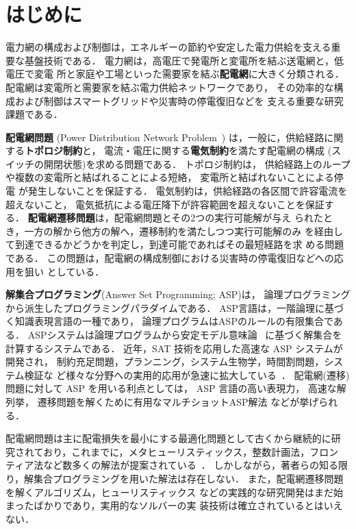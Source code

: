 \section{はじめに}\label{chap:intro}

電力網の構成および制御は，エネルギーの節約や安定した電力供給を支える重
要な基盤技術である．
電力網は，高電圧で発電所と変電所を結ぶ送電網と，低電圧で変電
所と家庭や工場といった需要家を結ぶ\textbf{配電網}に大きく分類される．
配電網は変電所と需要家を結ぶ電力供給ネットワークであり，
その効率的な構成および制御はスマートグリッドや災害時の停電復旧などを
支える重要な研究課題である．

\textbf{配電網問題}
(Power Distribution Network Problem~\cite{Minato:dnet:ZDD,DBLP:journals/tsg/InoueTWKYKTMH14})
は，一般に，供給経路に関する\textbf{トポロジ制約}と，
電流・電圧に関する\textbf{電気制約}を満たす配電網の構成
(スイッチの開閉状態)を求める問題である．
トポロジ制約は，
供給経路上のループや複数の変電所と結ばれることによる短絡，
変電所と結ばれないことによる停電
が発生しないことを保証する．
電気制約は，供給経路の各区間で許容電流を超えないこと，
電気抵抗による電圧降下が許容範囲を超えないことを保証する．
%
\textbf{配電網遷移問題}は，配電網問題とその2つの実行可能解が与え
られたとき，一方の解から他方の解へ，遷移制約を満たしつつ実行可能解のみ
を経由して到達できるかどうかを判定し，到達可能であればその最短経路を求
める問題である．
この問題は，配電網の構成制御における災害時の停電復旧などへの応用を狙い
としている．

\textbf{解集合プログラミング}(Answer Set Programming; ASP\cite{%
  Baral03:cambridge,%
  Gelfond88:iclp,%
  Inoue08:jssst,%
  Niemela99:amai})は，
論理プログラミングから派生したプログラミングパラダイムである．
ASP言語は，一階論理に基づく知識表現言語の一種であり，
論理プログラムはASPのルールの有限集合である．
ASPシステムは論理プログラムから安定モデル意味論~\cite{Gelfond88:iclp}
に基づく解集合を計算するシステムである．
近年，SAT 技術を応用した高速な ASP システムが開発され，
制約充足問題，プランニング，システム生物学，時間割問題，システム検証な
ど様々な分野への実用的応用が急速に拡大している~\cite{%
  DBLP:journals/anor/BanbaraIKOSSTW19,%
  DBLP:journals/tplp/BanbaraKOS17,%
  ASPAISAT}．
配電網(遷移)問題に対して ASP を用いる利点としては，
ASP 言語の高い表現力，
高速な解列挙，
遷移問題を解くために有用なマルチショットASP解法
などが挙げられる．

配電網問題は主に配電損失を最小にする最適化問題として古くから継続的に研
究されており，これまでに，メタヒューリスティックス，整数計画法，フロン
ティア法など数多くの解法が提案されている~\cite{%
  ChiJum90,
  Hayashi:dnet:model,
  Minato:dnet:ZDD,
  DBLP:journals/tsg/InoueTWKYKTMH14}．
しかしながら，著者らの知る限り，解集合プログラミングを用いた解法は存在しない．
また，配電網遷移問題を解くアルゴリズム，ヒューリスティックス
などの実践的な研究開発はまだ始まったばかりであり，実用的なソルバーの実
装技術は確立されているとはいえない．

